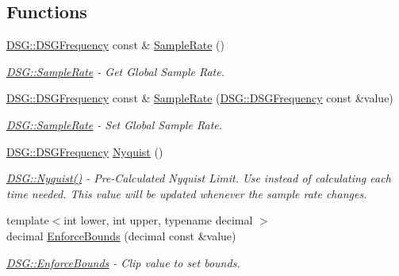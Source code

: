 \subsection*{Functions}
\begin{DoxyCompactItemize}
\item 
\hyperlink{namespace_d_s_g_a4315a061386fa1014fda09b15d3a6973}{D\+S\+G\+::\+D\+S\+G\+Frequency} const \& \hyperlink{namespace_d_s_g_a72df05177db0412c3590070923f62819}{Sample\+Rate} ()
\begin{DoxyCompactList}\small\item\em \hyperlink{namespace_d_s_g_a72df05177db0412c3590070923f62819}{D\+S\+G\+::\+Sample\+Rate} -\/ Get Global Sample Rate. \end{DoxyCompactList}\item 
\hyperlink{namespace_d_s_g_a4315a061386fa1014fda09b15d3a6973}{D\+S\+G\+::\+D\+S\+G\+Frequency} const \& \hyperlink{namespace_d_s_g_a66a464f016da1a099abea61a27a84d18}{Sample\+Rate} (\hyperlink{namespace_d_s_g_a4315a061386fa1014fda09b15d3a6973}{D\+S\+G\+::\+D\+S\+G\+Frequency} const \&value)
\begin{DoxyCompactList}\small\item\em \hyperlink{namespace_d_s_g_a72df05177db0412c3590070923f62819}{D\+S\+G\+::\+Sample\+Rate} -\/ Set Global Sample Rate. \end{DoxyCompactList}\item 
\hyperlink{namespace_d_s_g_a4315a061386fa1014fda09b15d3a6973}{D\+S\+G\+::\+D\+S\+G\+Frequency} \hyperlink{namespace_d_s_g_acb23c320b74d21f203081a25e1b5d134}{Nyquist} ()
\begin{DoxyCompactList}\small\item\em \hyperlink{namespace_d_s_g_acb23c320b74d21f203081a25e1b5d134}{D\+S\+G\+::\+Nyquist()} -\/ Pre-\/\+Calculated Nyquist Limit. Use instead of calculating each time needed. This value will be updated whenever the sample rate changes. \end{DoxyCompactList}\item 
{\footnotesize template$<$int lower, int upper, typename decimal $>$ }\\decimal \hyperlink{namespace_d_s_g_a8bc6af8f213f4f713bd634ec8545491c}{Enforce\+Bounds} (decimal const \&value)
\begin{DoxyCompactList}\small\item\em \hyperlink{namespace_d_s_g_a8bc6af8f213f4f713bd634ec8545491c}{D\+S\+G\+::\+Enforce\+Bounds} -\/ Clip value to set bounds. \end{DoxyCompactList}\item 

\end{DoxyCompactItemize}
